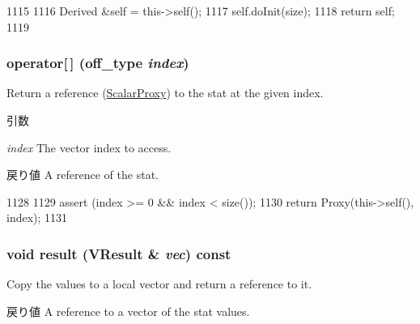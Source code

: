 \begin{DoxyCode}
1115     {
1116         Derived &self = this->self();
1117         self.doInit(size);
1118         return self;
1119     }
\end{DoxyCode}
\hypertarget{classStats_1_1VectorBase_ad22583203a39f3bb11549cc89ba71e9d}{
\subsubsection[{operator[]}]{ operator\mbox{[}$\,$\mbox{]} ({\bf off\_\-type} {\em index})}}
\label{classStats_1_1VectorBase_ad22583203a39f3bb11549cc89ba71e9d}
Return a reference (\hyperlink{classStats_1_1ScalarProxy}{ScalarProxy}) to the stat at the given index. 
\begin{DoxyParams}{引数}
\item[{\em index}]The vector index to access. \end{DoxyParams}
\begin{DoxyReturn}{戻り値}
A reference of the stat. 
\end{DoxyReturn}



\begin{DoxyCode}
1128     {
1129         assert (index >= 0 && index < size());
1130         return Proxy(this->self(), index);
1131     }
\end{DoxyCode}
\hypertarget{classStats_1_1VectorBase_a9dff2394cecff3afb2bf8662c9c9bc04}{
\subsubsection[{result}]{\setlength{\rightskip}{0pt plus 5cm}void result ({\bf VResult} \& {\em vec}) const}}
\label{classStats_1_1VectorBase_a9dff2394cecff3afb2bf8662c9c9bc04}
Copy the values to a local vector and return a reference to it. \begin{DoxyReturn}{戻り値}
A reference to a vector of the stat values. 
\end{DoxyReturn}



